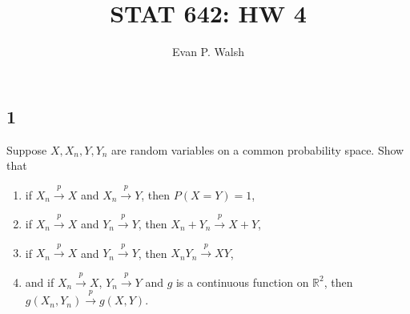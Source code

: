 \documentclass[12pt]{article}
\title{STAT 642: HW 4}
\author{Evan P. Walsh}
\begin{document}

\def\cp{\stackrel{p}{\rightarrow}}
\def\as{\stackrel{\text{a.s.}}{\longrightarrow}}

\subsection*{1}
\begin{tcolorbox}
Suppose $X, X_{n}, Y, Y_{n}$ are random variables on a common probability space. Show that
\begin{enumerate}[label=(\alph*)]
\item if $X_{n} \stackrel{p}{\rightarrow} X$ and $X_{n}\stackrel{p}{\rightarrow}Y$, then $P(X = Y) = 1$,
\item if $X_{n}\cp X$ and $Y_{n} \cp Y$, then $X_{n} + Y_{n} \cp X + Y$,
\item if $X_{n}\cp X$ and $Y_{n}\cp Y$, then $X_{n}Y_{n}\cp XY$, 
\item and if $X_{n}\cp X$, $Y_{n}\cp Y$ and $g$ is a continuous function on $\mathbb{R}^{2}$, then $g(X_{n},Y_{n})\cp g(X,Y)$.
\end{enumerate}
\end{tcolorbox}
\end{document}
